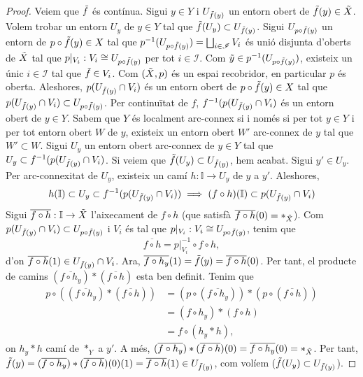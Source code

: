 \documentclass[compress,10pt]{article}
\theoremstyle{definition}
\begin{document}
\begin{proof}
    Veiem que $\Tilde{f}$ és contínua. Sigui $y\in Y$ i $U_{\Tilde{f}(y)}$ un entorn obert de $\Tilde{f}(y)\in\Tilde{X}$. Volem trobar un entorn $U_{y}$ de $y\in Y$ tal que $\Tilde{f}(U_{y})\subset U_{\Tilde{f}(y)}$. Sigui $U_{p\circ\Tilde{f}(y)}$ un entorn de $p\circ\Tilde{f}(y)\in X$ tal que $p^{-1}(U_{p\circ\Tilde{f}(y)})=\bigsqcup_{i\in\mathscr{I}}V_{i}$ és unió disjunta d'oberts de $\Tilde{X}$ tal que $p|_{V_{i}}:V_{i}\cong U_{p\circ\Tilde{f}(y)}$ per tot $i\in\mathscr{I}$. Com $\Tilde{y}\in p^{-1}(U_{p\circ\Tilde{f}(y)})$, existeix un únic $i\in\mathscr{I}$ tal que $\Tilde{f}\in V_{i}$. Com $(\Tilde{X},p)$ és un espai recobridor, en particular $p$ és oberta. Aleshores, $p(U_{\Tilde{f}(y)}\cap V_{i})$ és un entorn obert de $p\circ\Tilde{f}(y)\in X$ tal que $p(U_{\Tilde{f}(y)}\cap V_{i})\subset U_{p\circ\Tilde{f}(y)}$. Per continuïtat de $f$, $f^{-1}(p(U_{\Tilde{f}(y)}\cap V_{i})$ és un entorn obert de $y\in Y$. Sabem que $Y$ és localment arc-connex si i només si per tot $y\in Y$ i per tot entorn obert $W$ de $y$, existeix un entorn obert $W'$ arc-connex de $y$ tal que $W'\subset W$. Sigui $U_{y}$ un entorn obert arc-connex de $y\in Y$ tal que $U_{y}\subset f^{-1}(p(U_{\Tilde{f}(y)}\cap V_{i})$. Si veiem que $\Tilde{f}(U_{y})\subset U_{\Tilde{f}(y)}$, hem acabat.\newline
    Sigui $y'\in U_{y}$. Per arc-connexitat de $U_{y}$, existeix un camí $h:\mathbb{I}\rightarrow U_{y}$ de $y$ a $y'$. Aleshores,
    \begin{equation}
        h(\mathbb{I})\subset U_{y}\subset f^{-1}(p(U_{\Tilde{f}(y)}\cap V_{i}))
        \implies
        (f\circ h)(\mathbb{I})\subset p(U_{\Tilde{f}(y)}\cap V_{i})
    \end{equation}
    Sigui $\overline{f\circ h}:\mathbb{I}\rightarrow\Tilde{X}$ l'aixecament de $f\circ h$ (que satisfà $\overline{f\circ h}(0)=*_{\Tilde{X}}$). Com $p(U_{\Tilde{f}(y)}\cap V_{i})\subset U_{p\circ\Tilde{f}(y)}$ i $V_{i}$ és tal que $p|_{V_{i}}:V_{i}\cong U_{p\circ\Tilde{f}(y)}$, tenim que
    \begin{equation}
        \overline{f\circ h}=p|_{V_{i}}^{-1}\circ f\circ h,
    \end{equation}
    d'on $\overline{f\circ h}(1)\in U_{\Tilde{f}(y)}\cap V_{i}$. Ara, $\overline{f\circ h_{y}}(1)=\Tilde{f}(y)=\overline{f\circ h}(0)$. Per tant, el producte de camins $(\overline{f\circ h_{y}})*(\overline{f\circ h})$ esta ben definit. Tenim que
    \begin{equation*}
    \begin{split}
        p\circ((\overline{f\circ h_{y}})*(\overline{f\circ h}))
        &=(p\circ(\overline{f\circ h_{y}}))*(p\circ(\overline{f\circ h}))\\
        &=(f\circ h_{y})*(f\circ h)\\
        &=f\circ(h_{y}*h),
    \end{split}
    \end{equation*}
    on $h_{y}*h$ camí de $*_{Y}$ a $y'$. A més, $(\overline{f\circ h_{y}})*(\overline{f\circ h})(0)=\overline{f\circ h_{y}}(0)=*_{\Tilde{X}}$. Per tant, $\Tilde{f}(y)=(\overline{f\circ h_{y}})*(\overline{f\circ h})(0)(1)=\overline{f\circ h}(1)\in U_{\Tilde{f}(y)}$, com volíem ($\Tilde{f}(U_{y})\subset U_{\Tilde{f}(y)}$).
\end{proof}
\end{document}
